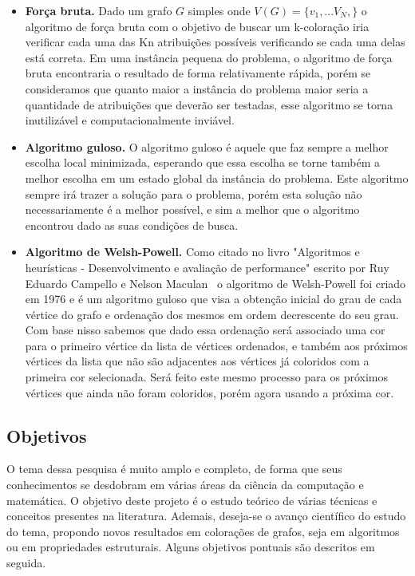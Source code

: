 \documentclass[12pt]{article}
\begin{document}
   \begin{itemize}
		
   \item \textbf{Força bruta.}	Dado um grafo $G$ simples onde $V(G) = \{v_{1}, ... V_{N},\}$ o algoritmo de força bruta com o objetivo de buscar um k-coloração iria verificar cada uma das Kn atribuições possíveis verificando se cada uma delas está correta. Em uma instância pequena do problema, o algoritmo de força bruta encontraria o resultado de forma relativamente rápida, porém se consideramos que quanto maior a instância do problema maior seria a quantidade de atribuições que deverão ser testadas, esse algoritmo se torna inutilizável e computacionalmente inviável.
	
	
    \item \textbf{Algoritmo guloso.} O algoritmo guloso é aquele que faz sempre a melhor escolha local minimizada, esperando que essa escolha se torne também a melhor escolha em um estado global da instância do problema.
	Este algoritmo sempre irá trazer a solução para o problema, porém esta solução não necessariamente é a melhor possível, e sim a melhor que o algoritmo encontrou dado as suas condições de busca.
	
	
    
	\item \textbf{Algoritmo de Welsh-Powell.} Como citado no livro "Algoritmos e heurísticas - Desenvolvimento e avaliação de performance" escrito por Ruy Eduardo Campello e Nelson Maculan~\cite{AlgortimosHeuristicas}  o algoritmo de Welsh-Powell foi criado em 1976 e é um algoritmo guloso que visa a obtenção inicial do grau de cada vértice do grafo e ordenação dos mesmos em ordem decrescente do seu grau. Com base nisso sabemos que dado essa ordenação será associado uma cor para o primeiro vértice da lista de vértices ordenados, e também aos próximos vértices da lista que não são adjacentes aos vértices já coloridos com a primeira cor selecionada. Será feito este mesmo processo para os próximos vértices que ainda não foram coloridos, porém agora usando a próxima cor.
	
   \end{itemize}
 
	\subsection{Objetivos}
	
	O tema dessa pesquisa é muito amplo e completo, de forma que seus conhecimentos se desdobram em várias áreas da ciência da computação e matemática. O objetivo deste projeto é o estudo teórico de várias técnicas e conceitos presentes na literatura. Ademais, deseja-se o avanço científico do estudo do tema, propondo novos resultados em colorações de grafos, seja em algoritmos ou em propriedades estruturais. Alguns objetivos pontuais são descritos em seguida.
	
\end{document}
